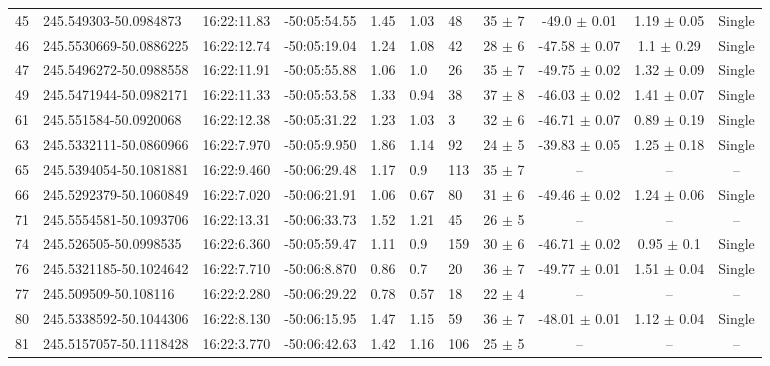 \begin{table}[htbp!]
\begin{tabular}{llllllllccc}
45  &  245.549303-50.0984873  &  16:22:11.83  &  -50:05:54.55  &  1.45  &  1.03  &  48  &  35 $\pm$ 7  &  -49.0 $\pm$ 0.01  &  1.19 $\pm$ 0.05  &  Single \\
46  &  245.5530669-50.0886225  &  16:22:12.74  &  -50:05:19.04  &  1.24  &  1.08  &  42  &  28 $\pm$ 6  &  -47.58 $\pm$ 0.07  &  1.1 $\pm$ 0.29  &  Single \\
47  &  245.5496272-50.0988558  &  16:22:11.91  &  -50:05:55.88  &  1.06  &  1.0  &  26  &  35 $\pm$ 7  &  -49.75 $\pm$ 0.02  &  1.32 $\pm$ 0.09  &  Single \\
49  &  245.5471944-50.0982171  &  16:22:11.33  &  -50:05:53.58  &  1.33  &  0.94  &  38  &  37 $\pm$ 8  &  -46.03 $\pm$ 0.02  &  1.41 $\pm$ 0.07  &  Single \\
61  &  245.551584-50.0920068  &  16:22:12.38  &  -50:05:31.22  &  1.23  &  1.03  &  3  &  32 $\pm$ 6  &  -46.71 $\pm$ 0.07  &  0.89 $\pm$ 0.19  &  Single \\
63  &  245.5332111-50.0860966  &  16:22:7.970  &  -50:05:9.950  &  1.86  &  1.14  &  92  &  24 $\pm$ 5  &  -39.83 $\pm$ 0.05  &  1.25 $\pm$ 0.18  &  Single \\
65  &  245.5394054-50.1081881  &  16:22:9.460  &  -50:06:29.48  &  1.17  &  0.9  &  113  &  35 $\pm$ 7  &  --  &  --  &  -- \\
66  &  245.5292379-50.1060849  &  16:22:7.020  &  -50:06:21.91  &  1.06  &  0.67  &  80  &  31 $\pm$ 6  &  -49.46 $\pm$ 0.02  &  1.24 $\pm$ 0.06  &  Single \\
71  &  245.5554581-50.1093706  &  16:22:13.31  &  -50:06:33.73  &  1.52  &  1.21  &  45  &  26 $\pm$ 5  &  --  &  --  &  -- \\
74  &  245.526505-50.0998535  &  16:22:6.360  &  -50:05:59.47  &  1.11  &  0.9  &  159  &  30 $\pm$ 6  &  -46.71 $\pm$ 0.02  &  0.95 $\pm$ 0.1  &  Single \\
76  &  245.5321185-50.1024642  &  16:22:7.710  &  -50:06:8.870  &  0.86  &  0.7  &  20  &  36 $\pm$ 7  &  -49.77 $\pm$ 0.01  &  1.51 $\pm$ 0.04  &  Single \\
77  &  245.509509-50.108116  &  16:22:2.280  &  -50:06:29.22  &  0.78  &  0.57  &  18  &  22 $\pm$ 4  &  --  &  --  &  -- \\
80  &  245.5338592-50.1044306  &  16:22:8.130  &  -50:06:15.95  &  1.47  &  1.15  &  59  &  36 $\pm$ 7  &  -48.01 $\pm$ 0.01  &  1.12 $\pm$ 0.04  &  Single \\
81  &  245.5157057-50.1118428  &  16:22:3.770  &  -50:06:42.63  &  1.42  &  1.16  &  106  &  25 $\pm$ 5  &  --  &  --  &  -- \\

\end{tabular}
\end{table}
